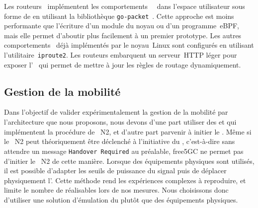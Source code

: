 \documentclass[../main.tex]{subfiles}
\begin{document}
Les routeurs~ implémentent les comportements~~ dans l’espace utilisateur sous forme de  en utilisant la bibliothèque \texttt{go-packet}~\cite{GOPACKET}.
Cette approche est moins performante que l’écriture d’un module du noyau ou d’un programme~eBPF, mais elle permet d’aboutir plus facilement à un premier prototype.
Les autres comportements~ déjà implémentés par le noyau~Linux sont configurés en utilisant l’utilitaire~\texttt{iproute2}.
Les routeurs embarquent un serveur~HTTP léger pour exposer l’~ qui permet de mettre à jour les règles de routage dynamiquement.

\subsection{Gestion de la mobilité}
Dans l’objectif de valider expérimentalement la gestion de la mobilité par l’architecture que nous proposons, nous devons d’une part utiliser des  et  qui implémentent la procédure de ~N2, et d’autre part parvenir à initier le .
Même si le ~N2 peut théoriquement être déclenché à l’initiative du , c’est-à-dire sans attendre un message \texttt{Handover~Required} au préalable, free5GC ne permet pas d’initier le ~N2 de cette manière.
Lorsque des équipements physiques sont utilisés, il est possible d’adapter les seuils de puissance du signal puis de déplacer physiquement l’.
Cette méthode rend les expériences complexes à reproduire, et limite le nombre de  réalisables lors de nos mesures.
Nous choisissons donc d’utiliser une solution d’émulation du  plutôt que des équipements physiques.
\end{document}

